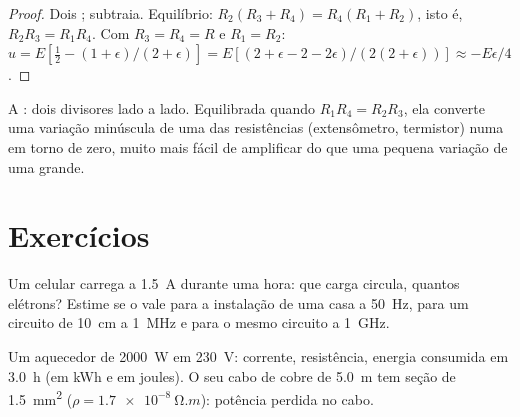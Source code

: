 \begin{proof}
Dois ; subtraia. Equilíbrio: $R_2(R_3 + R_4) = R_4(R_1 +
R_2)$, isto é,\ $R_2R_3 = R_1R_4$. Com $R_3 = R_4 = R$ e $R_1 = R_2$:
$u = E[\tfrac12 - (1 + \epsilon)/(2 + \epsilon)] = E[(2 + \epsilon - 2 -
2\epsilon)/(2(2 + \epsilon))] \approx -E\epsilon/4$.
\end{proof}

\begin{omfigure}

{\small A : dois divisores lado a lado. Equilibrada quando
$R_1R_4 = R_2R_3$, ela converte uma variação minúscula de uma das resistências
(extensômetro, termistor) numa  em torno de zero, muito
mais fácil de amplificar do que uma pequena variação de uma  grande.}
\end{omfigure}

\section{Exercícios}

\begin{exercise}[$\star$]\label{exo:b1:dc-circuits:1}
Um celular carrega a \qty{1.5}{A} durante uma hora: que carga circula, quantos
elétrons? Estime se o  vale para a
instalação de uma casa a \qty{50}{Hz}, para um circuito de \qty{10}{cm} a \qty{1}{MHz}
e para o mesmo circuito a \qty{1}{GHz}.
\end{exercise}

\begin{exercise}[$\star$]\label{exo:b1:dc-circuits:2}
Um aquecedor de \qty{2000}{W} em \qty{230}{V}: corrente, resistência, energia
consumida em \qty{3.0}{h} (em kWh e em joules). O seu cabo de cobre de \qty{5.0}{m}
tem seção de \qty{1.5}{mm^2} ($\rho = \qty{1.7e-8}{\ohm.m}$):
potência perdida no cabo.
\end{exercise}

